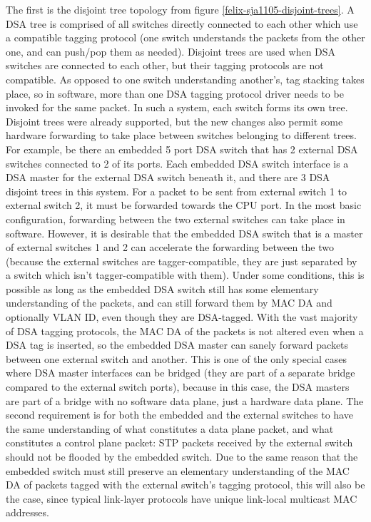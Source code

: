 \documentclass[letterpaper]{article}
\begin{document}
The first is the disjoint tree topology from figure
\ref{felix-sja1105-disjoint-trees}. A DSA tree is comprised of all switches
directly connected to each other which use a compatible tagging protocol (one
switch understands the packets from the other one, and can push/pop them as
needed). Disjoint trees are used when DSA switches are connected to each other,
but their tagging protocols are not compatible.  As opposed to one switch
understanding another's, tag stacking takes place, so in software, more than
one DSA tagging protocol driver needs to be invoked for the same packet. In
such a system, each switch forms its own tree. Disjoint trees were already
supported, but the new changes also permit some hardware forwarding to take
place between switches belonging to different trees. For example, be there an
embedded 5 port DSA switch that has 2 external DSA switches connected to 2 of
its ports. Each embedded DSA switch interface is a DSA master for the external
DSA switch beneath it, and there are 3 DSA disjoint trees in this system. For a
packet to be sent from external switch 1 to external switch 2, it must be
forwarded towards the CPU port. In the most basic configuration, forwarding
between the two external switches can take place in software. However, it is
desirable that the embedded DSA switch that is a master of external switches 1
and 2 can accelerate the forwarding between the two (because the external
switches are tagger-compatible, they are just separated by a switch which isn't
tagger-compatible with them). Under some conditions, this is possible as long
as the embedded DSA switch still has some elementary understanding of the
packets, and can still forward them by MAC DA and optionally VLAN ID, even
though they are DSA-tagged. With the vast majority of DSA tagging protocols,
the MAC DA of the packets is not altered even when a DSA tag is inserted, so
the embedded DSA master can sanely forward packets between one external switch
and another. This is one of the only special cases where DSA master interfaces
can be bridged (they are part of a separate bridge compared to the external
switch ports), because in this case, the DSA masters are part of a bridge with
no software data plane, just a hardware data plane.  The second requirement is
for both the embedded and the external switches to have the same understanding
of what constitutes a data plane packet, and what constitutes a control plane
packet: STP packets received by the external switch should not be flooded by
the embedded switch. Due to the same reason that the embedded switch must still
preserve an elementary understanding of the MAC DA of packets tagged with the
external switch's tagging protocol, this will also be the case, since typical
link-layer protocols have unique link-local multicast MAC addresses.
\end{document}
